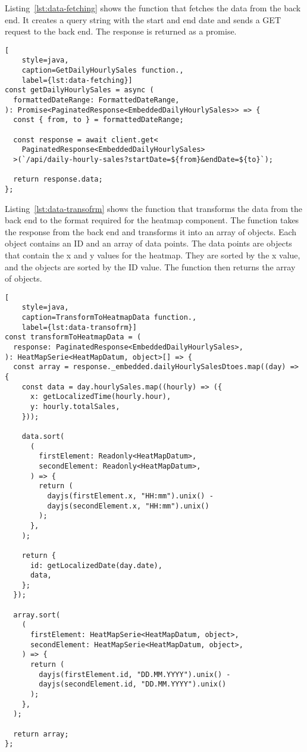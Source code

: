 Listing~\ref{lst:data-fetching} shows the function that fetches the data from the back end.
It creates a query string with the start and end date and sends a GET request to the back end.
The response is returned as a promise.

\begin{lstlisting}[
    style=java,
    caption=GetDailyHourlySales function.,
    label={lst:data-fetching}]
const getDailyHourlySales = async (
  formattedDateRange: FormattedDateRange,
): Promise<PaginatedResponse<EmbeddedDailyHourlySales>> => {
  const { from, to } = formattedDateRange;

  const response = await client.get<
    PaginatedResponse<EmbeddedDailyHourlySales>
  >(`/api/daily-hourly-sales?startDate=${from}&endDate=${to}`);

  return response.data;
};
\end{lstlisting}

Listing~\ref{lst:data-transofrm} shows the function that transforms the data from the back end to the format required
for the heatmap component.
The function takes the response from the back end and transforms it into an array of objects.
Each object contains an ID and an array of data points.
The data points are objects that contain the x and y values for the heatmap.
They are sorted by the x value, and the objects are sorted by the ID value.
The function then returns the array of objects.

\begin{lstlisting}[
    style=java,
    caption=TransformToHeatmapData function.,
    label={lst:data-transofrm}]
const transformToHeatmapData = (
  response: PaginatedResponse<EmbeddedDailyHourlySales>,
): HeatMapSerie<HeatMapDatum, object>[] => {
  const array = response._embedded.dailyHourlySalesDtoes.map((day) => {
    const data = day.hourlySales.map((hourly) => ({
      x: getLocalizedTime(hourly.hour),
      y: hourly.totalSales,
    }));

    data.sort(
      (
        firstElement: Readonly<HeatMapDatum>,
        secondElement: Readonly<HeatMapDatum>,
      ) => {
        return (
          dayjs(firstElement.x, "HH:mm").unix() -
          dayjs(secondElement.x, "HH:mm").unix()
        );
      },
    );

    return {
      id: getLocalizedDate(day.date),
      data,
    };
  });

  array.sort(
    (
      firstElement: HeatMapSerie<HeatMapDatum, object>,
      secondElement: HeatMapSerie<HeatMapDatum, object>,
    ) => {
      return (
        dayjs(firstElement.id, "DD.MM.YYYY").unix() -
        dayjs(secondElement.id, "DD.MM.YYYY").unix()
      );
    },
  );

  return array;
};
\end{lstlisting}

